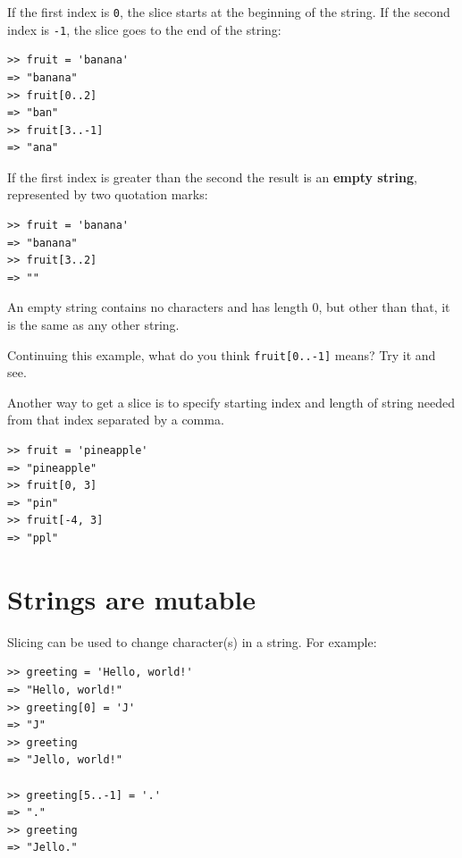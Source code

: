 \documentclass[10pt]{book}
\begin{document}
If the first index is {\tt 0}, the slice starts at
the beginning of the string.  If the second index is {\tt -1}, the slice
goes to the end of the string:

\begin{verbatim}
>> fruit = 'banana'
=> "banana"
>> fruit[0..2]
=> "ban"
>> fruit[3..-1]
=> "ana"
\end{verbatim}
%
If the first index is greater than the second the result
is an {\bf empty string}, represented by two quotation marks:

\begin{verbatim}
>> fruit = 'banana'
=> "banana"
>> fruit[3..2]
=> ""
\end{verbatim}
%
An empty string contains no characters and has length 0, but other
than that, it is the same as any other string.

Continuing this example, what do you think 
{\tt fruit[0..-1]} means?  Try it and see.

Another way to get a slice is to specify starting index and length
of string needed from that index separated by a comma.

\begin{verbatim}
>> fruit = 'pineapple'
=> "pineapple"
>> fruit[0, 3]
=> "pin"
>> fruit[-4, 3]
=> "ppl"
\end{verbatim}


\section{Strings are mutable}

Slicing can be used to change character(s) in a string.
For example:

\begin{verbatim}
>> greeting = 'Hello, world!'
=> "Hello, world!"
>> greeting[0] = 'J'
=> "J"
>> greeting
=> "Jello, world!"

>> greeting[5..-1] = '.'
=> "."
>> greeting
=> "Jello."
\end{verbatim}
%
\end{document}
